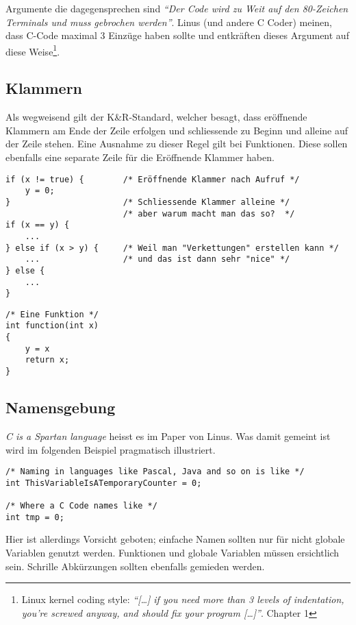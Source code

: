 Argumente die dagegensprechen sind \emph{``Der Code wird zu Weit auf den
80-Zeichen Terminals und muss gebrochen werden''}. Linus (und andere C 
Coder) meinen, dass C-Code maximal 3 Einzüge haben sollte und entkräften
dieses Argument auf diese Weise\footnote{
    Linux kernel coding style: \emph{``[\dots] if you need more than
    3 levels of indentation, you're screwed anyway, and should fix your 
    program [\dots]''}. Chapter 1}.

\subsection{Klammern}
Als wegweisend gilt der K\&R-Standard, welcher besagt, dass eröffnende
Klammern am Ende der Zeile erfolgen und schliessende zu Beginn und alleine
auf der Zeile stehen. Eine Ausnahme zu dieser Regel gilt bei Funktionen.
Diese sollen ebenfalls eine separate Zeile für die Eröffnende Klammer
haben.

\begin{lstlisting}
if (x != true) {        /* Eröffnende Klammer nach Aufruf */
    y = 0;              
}                       /* Schliessende Klammer alleine */
                        /* aber warum macht man das so?  */
if (x == y) {
    ...
} else if (x > y) {     /* Weil man "Verkettungen" erstellen kann */
    ...                 /* und das ist dann sehr "nice" */
} else {
    ...
}
\end{lstlisting}
\begin{lstlisting}
/* Eine Funktion */
int function(int x)
{
    y = x
    return x;
}
\end{lstlisting}

\subsection{Namensgebung}
\emph{C is a Spartan language} heisst es im Paper von Linus. Was damit
gemeint ist wird im folgenden Beispiel pragmatisch illustriert.

\begin{lstlisting}
/* Naming in languages like Pascal, Java and so on is like */
int ThisVariableIsATemporaryCounter = 0;

/* Where a C Code names like */
int tmp = 0;
\end{lstlisting}

Hier ist allerdings Vorsicht geboten; einfache Namen sollten nur für nicht
globale Variablen genutzt werden. Funktionen und globale Variablen müssen
ersichtlich sein. Schrille Abkürzungen sollten ebenfalls gemieden werden.


